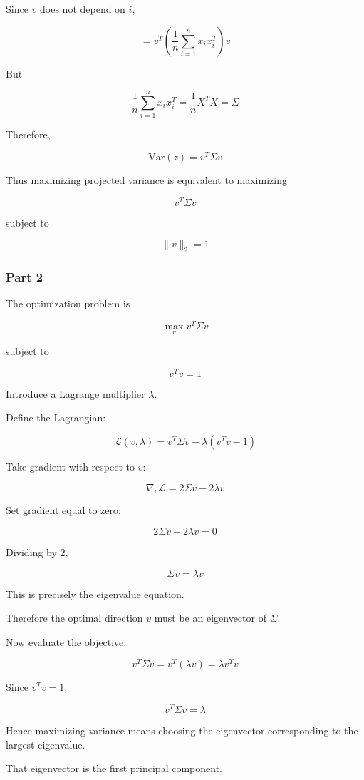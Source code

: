 \documentclass[12pt]{article}
\begin{document}
Since \(v\) does not depend on \(i\),

\[
=
v^T
\left(
\frac1n\sum_{i=1}^n x_i x_i^T
\right)
v
\]

But

\[
\frac1n\sum_{i=1}^n x_i x_i^T
=
\frac1n X^TX
=
\Sigma
\]

Therefore,

\[
\mathrm{Var}(z)
=
v^T\Sigma v
\]

Thus maximizing projected variance is equivalent to maximizing

\[
v^T\Sigma v
\]

subject to

\[
\|v\|_2=1
\]

\subsubsection*{Part 2}

The optimization problem is

\[
\max_v v^T\Sigma v
\]

subject to

\[
v^Tv=1
\]

Introduce a Lagrange multiplier \(\lambda\).

Define the Lagrangian:

\[
\mathcal L(v,\lambda)
=
v^T\Sigma v
-
\lambda(v^Tv-1)
\]

Take gradient with respect to \(v\):

\[
\nabla_v \mathcal L
=
2\Sigma v - 2\lambda v
\]

Set gradient equal to zero:

\[
2\Sigma v - 2\lambda v = 0
\]

Dividing by \(2\),

\[
\Sigma v = \lambda v
\]

This is precisely the eigenvalue equation.

Therefore the optimal direction \(v\) must be an eigenvector of \(\Sigma\).

Now evaluate the objective:

\[
v^T\Sigma v
=
v^T(\lambda v)
=
\lambda v^Tv
\]

Since \(v^Tv=1\),

\[
v^T\Sigma v = \lambda
\]

Hence maximizing variance means choosing the eigenvector corresponding to the largest eigenvalue.

That eigenvector is the first principal component.
\end{document}
